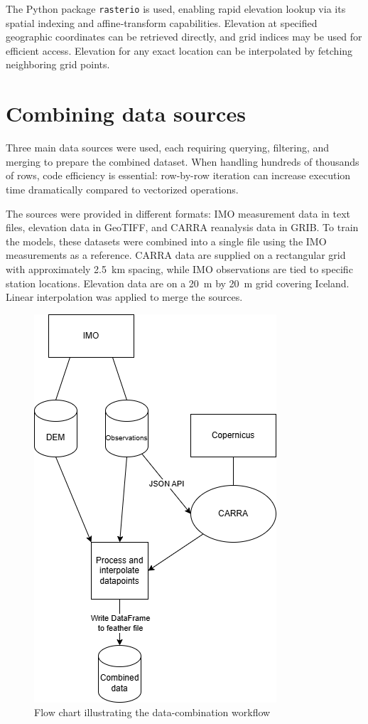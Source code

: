 The Python package \texttt{rasterio} is used, enabling rapid elevation lookup via its spatial indexing and affine‐transform capabilities. Elevation at specified geographic coordinates can be retrieved directly, and grid indices may be used for efficient access. Elevation for any exact location can be interpolated by fetching neighboring grid points.

\section{Combining data sources}

Three main data sources were used, each requiring querying, filtering, and merging to prepare the combined dataset. When handling hundreds of thousands of rows, code efficiency is essential: row-by-row iteration can increase execution time dramatically compared to vectorized operations.

The sources were provided in different formats: IMO measurement data in text files, elevation data in GeoTIFF, and CARRA reanalysis data in GRIB. To train the models, these datasets were combined into a single file using the IMO measurements as a reference. CARRA data are supplied on a rectangular grid with approximately 2.5~km spacing, while IMO observations are tied to specific station locations. Elevation data are on a 20~m by 20~m grid covering Iceland. Linear interpolation was applied to merge the sources.

\begin{figure}[h]
  \centering
  \includegraphics[scale=0.6]{Figures/data_combination.drawio.png}
  \caption{Flow chart illustrating the data-combination workflow}
  \label{fig:data_preprocessing_flow_chart}
\end{figure}

